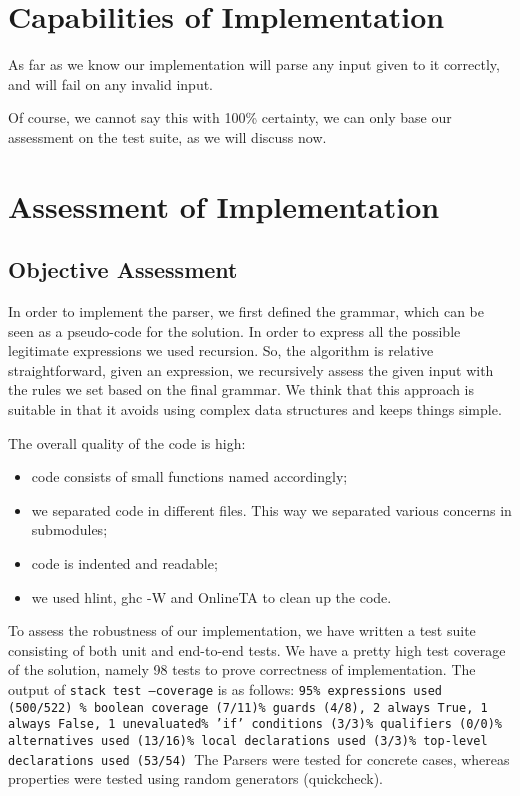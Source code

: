 \documentclass{article}
\begin{document}
\section{Capabilities of Implementation}
As far as we know our implementation will parse any input given to it correctly, and will fail on any invalid input. 

Of course, we cannot say this with 100\% certainty, we can only base our assessment on the test suite, as we will discuss now.


\section{Assessment of Implementation}

\subsection{Objective Assessment}
In order to implement the parser, we first defined the grammar, which can be seen as a pseudo-code for the solution. In order to express all the possible legitimate expressions we used recursion. So, the algorithm is relative straightforward, given an expression, we recursively assess the given input with the rules we set based on the final grammar. We think that this approach is suitable in that it avoids using complex data structures and keeps things simple.

The overall quality of the code is high: 
\begin{itemize}
	\item code consists of small functions named accordingly;
	\item we separated code in different files. This way we separated various concerns in submodules;
	\item code is indented and readable;
	\item we used hlint, ghc -W and OnlineTA to clean up the code.
\end{itemize}
 
To assess the robustness of our implementation, we have written a test suite consisting of both unit and end-to-end tests.
We have a pretty high test coverage of the solution, namely 98 tests to prove correctness of implementation. The output of \texttt{stack test --coverage} is as follows: \newline
\texttt{95\% expressions used (500/522) \% boolean coverage (7/11)\% guards (4/8), 2 always True, 1 always False, 1 unevaluated\% 'if' conditions (3/3)\% qualifiers (0/0)\% alternatives used (13/16)\% local declarations used (3/3)\% top-level declarations used (53/54)\newline
	}The Parsers were tested for concrete cases, whereas properties were tested using random generators (quickcheck).
\end{document}
